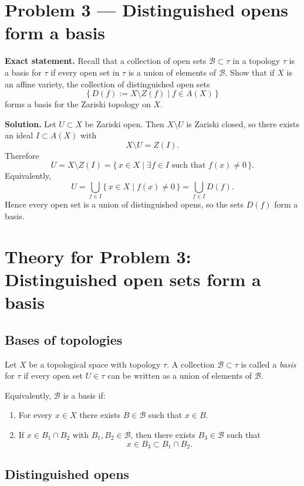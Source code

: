 \documentclass[12pt,a4paper]{article}
\theoremstyle{plain}
\theoremstyle{definition}      %
\begin{document}
\section*{Problem 3 — Distinguished opens form a basis}

\textbf{Exact statement.}
Recall that a collection of open sets $\mathcal B\subset \tau$ in a topology $\tau$
is a basis for $\tau$ if every open set in $\tau$ is a union of elements of $\mathcal B$.
Show that if $X$ is an affine variety, the collection of distinguished open sets
\[
\{\,D(f):=X\setminus Z(f)\mid f\in A(X)\,\}
\]
forms a basis for the Zariski topology on $X$.

\textbf{Solution.}
Let $U\subset X$ be Zariski open.
Then $X\setminus U$ is Zariski closed, so there exists an ideal $I\subset A(X)$ with
\[
X\setminus U
=
Z(I).
\]
Therefore
\[
U
=
X\setminus Z(I)
=
\{\,x\in X \mid \exists f\in I \text{ such that } f(x)\neq 0\,\}.
\]
Equivalently,
\[
U
=
\bigcup_{f\in I}
\{\,x\in X \mid f(x)\neq 0\,\}
=
\bigcup_{f\in I}
D(f).
\]
Hence every open set is a union of distinguished opens, so the sets $D(f)$ form a basis.

\section*{Theory for Problem 3: Distinguished open sets form a basis}

\subsection*{Bases of topologies}

Let $X$ be a topological space with topology $\tau$.
A collection $\mathcal B\subset \tau$ is called a \emph{basis} for $\tau$ if every open set $U\in \tau$ can be written as a union of elements of $\mathcal B$.

Equivalently, $\mathcal B$ is a basis if:
\begin{enumerate}
	\item For every $x\in X$ there exists $B\in \mathcal B$ such that $x\in B$.
	\item If $x\in B_1\cap B_2$ with $B_1,B_2\in \mathcal B$, then there exists $B_3\in \mathcal B$ such that
	\[
	x\in B_3\subset B_1\cap B_2.
	\]
\end{enumerate}

\subsection*{Distinguished opens}
\end{document}
